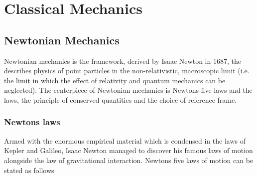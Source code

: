 \part{Classical Mechanics}

\chapter{Newtonian Mechanics}
Newtonian mechanics is the framework, derived by Isaac Newton in $1687$, the describes physics of point particles in the non-relativistic, macroscopic limit (i.e. the limit in which the effect of relativity and quantum mechanics can be neglected). The centerpiece of Newtonian mechanics is Newtons five laws and the laws, the principle of conserved quantities and the choice of reference frame.


\section{Newtons laws}
Armed with the enormous empirical material which is condensed in the laws of Kepler and Galileo, Isaac Newton managed to discover his famous laws of motion alongside the law of gravitational interaction. Newtons five laws of motion can be stated as follows~\citep{hjort}
